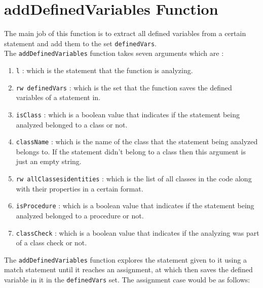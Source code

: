 \documentclass[11pt]{report}
\begin{document}
\section{addDefinedVariables Function}

The main job of this function is to extract all defined variables from a certain statement and add them to the set \texttt{definedVars}.
\\

The \texttt{addDefinedVariables} function takes seven arguments which are :

\begin{enumerate}
\item \texttt{l} : which is the statement that the function is analyzing.

\item \texttt{rw definedVars} : which is the set that the function saves the defined variables of a statement in.

\item \texttt{isClass} : which is a boolean value that indicates if the statement being analyzed belonged to a class or not.

\item \texttt{className} : which is the name of the class that the statement being analyzed belongs to. If the statement didn't belong to a class then this argument is just an empty string. 

\item \texttt{rw allClassesidentities} : which is the list of all classes in the code along with their properties in a certain format.

\item \texttt{isProcedure} : which is a boolean value that indicates if the statement being analyzed belonged to a procedure or not.

\item  \texttt{classCheck} : which is a boolean value that indicates if the analyzing was part of a class check or not.
\end{enumerate}

The \texttt{addDefinedVariables} function explores the statement given to it using a match statement until it reaches an assignment, at which then saves the defined variable in it in the \texttt{definedVars} set. The assignment case would be as follows: 
\end{document}

